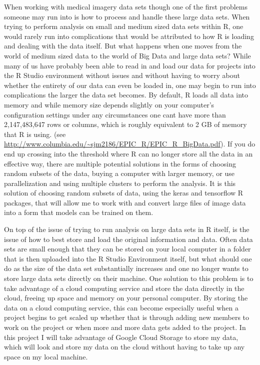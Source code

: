 \documentclass[12pt]{article}
\begin{document}
When working with medical imagery data sets though one of the first
problems someone may run into is how to process and handle these large
data sets. When trying to perform analysis on small and medium sized
data sets within R, one would rarely run into complications that would
be attributed to how R is loading and dealing with the data itself. But
what happens when one moves from the world of medium sized data to the
world of Big Data and large data sets? While many of us have probably
been able to read in and load our data for projects into the R Studio
environment without issues and without having to worry about whether the
entirety of our data can even be loaded in, one may begin to run into
complications the larger the data set becomes. By default, R loads all
data into memory and while memory size depends slightly on your
computer's configuration settings under any circumstances one cant have
more than 2,147,483,647 rows or columns, which is roughly equivalent to
2 GB of memory that R is using. (see
\url{http://www.columbia.edu/~sjm2186/EPIC_R/EPIC_R_BigData.pdf}). If
you do end up crossing into the threshold where R can no longer store
all the data in an effective way, there are multiple potential solutions
in the forms of choosing random subsets of the data, buying a computer
with larger memory, or use parallelization and using multiple clusters
to perform the analysis. It is this solution of choosing random subsets
of data, using the keras and tensorflow R packages, that will allow me
to work with and convert large files of image data into a form that
models can be trained on them.

On top of the issue of trying to run analysis on large data sets in R
itself, is the issue of how to best store and load the original
information and data. Often data sets are small enough that they can be
stored on your local computer in a folder that is then uploaded into the
R Studio Environment itself, but what should one do as the size of the
data set substantially increases and one no longer wants to store large
data sets directly on their machine. One solution to this problem is to
take advantage of a cloud computing service and store the data directly
in the cloud, freeing up space and memory on your personal computer. By
storing the data on a cloud computing service, this can become
especially useful when a project begins to get scaled up whether that is
through adding new members to work on the project or when more and more
data gets added to the project. In this project I will take advantage of
Google Cloud Storage to store my data, which will look and store my data
on the cloud without having to take up any space on my local machine.
\end{document}
